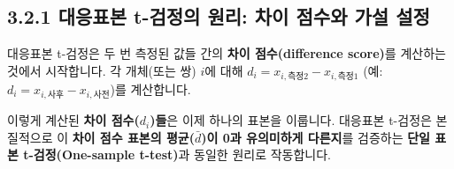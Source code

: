 \documentclass[
  letterpaper,
]{book}
\begin{document}
\subsection{3.2.1 대응표본 t-검정의 원리: 차이 점수와 가설
설정}\label{uxb300uxc751uxd45cuxbcf8-t-uxac80uxc815uxc758-uxc6d0uxb9ac-uxcc28uxc774-uxc810uxc218uxc640-uxac00uxc124-uxc124uxc815}

대응표본 t-검정은 두 번 측정된 값들 간의 \textbf{차이 점수(difference
score)}를 계산하는 것에서 시작합니다. 각 개체(또는 쌍) \(i\)에 대해
\(d_i = x_{i, \text{측정2}} - x_{i, \text{측정1}}\) (예:
\(d_i = x_{i, \text{사후}} - x_{i, \text{사전}}\))를 계산합니다.

이렇게 계산된 \textbf{차이 점수(\(d_i\))들}은 이제 하나의 표본을
이룹니다. 대응표본 t-검정은 본질적으로 이 \textbf{차이 점수 표본의
평균(\(\bar{d}\))이 0과 유의미하게 다른지}를 검증하는 \textbf{단일 표본
t-검정(One-sample t-test)}과 동일한 원리로 작동합니다.
\end{document}
